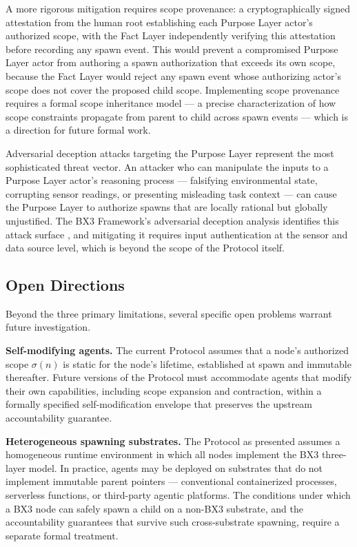 A more rigorous mitigation requires scope provenance: a cryptographically signed attestation from the human root establishing each Purpose Layer actor's authorized scope, with the Fact Layer independently verifying this attestation before recording any spawn event. This would prevent a compromised Purpose Layer actor from authoring a spawn authorization that exceeds its own scope, because the Fact Layer would reject any spawn event whose authorizing actor's scope does not cover the proposed child scope. Implementing scope provenance requires a formal scope inheritance model --- a precise characterization of how scope constraints propagate from parent to child across spawn events --- which is a direction for future formal work.

Adversarial deception attacks targeting the Purpose Layer represent the most sophisticated threat vector. An attacker who can manipulate the inputs to a Purpose Layer actor's reasoning process --- falsifying environmental state, corrupting sensor readings, or presenting misleading task context --- can cause the Purpose Layer to authorize spawns that are locally rational but globally unjustified. The BX3 Framework's adversarial deception analysis identifies this attack surface \cite{bx3-framework}, and mitigating it requires input authentication at the sensor and data source level, which is beyond the scope of the Protocol itself.

\subsection{Open Directions}

Beyond the three primary limitations, several specific open problems warrant future investigation.

\textbf{Self-modifying agents.} The current Protocol assumes that a node's authorized scope $\sigma(n)$ is static for the node's lifetime, established at spawn and immutable thereafter. Future versions of the Protocol must accommodate agents that modify their own capabilities, including scope expansion and contraction, within a formally specified self-modification envelope that preserves the upstream accountability guarantee.

\textbf{Heterogeneous spawning substrates.} The Protocol as presented assumes a homogeneous runtime environment in which all nodes implement the BX3 three-layer model. In practice, agents may be deployed on substrates that do not implement immutable parent pointers --- conventional containerized processes, serverless functions, or third-party agentic platforms. The conditions under which a BX3 node can safely spawn a child on a non-BX3 substrate, and the accountability guarantees that survive such cross-substrate spawning, require a separate formal treatment.

